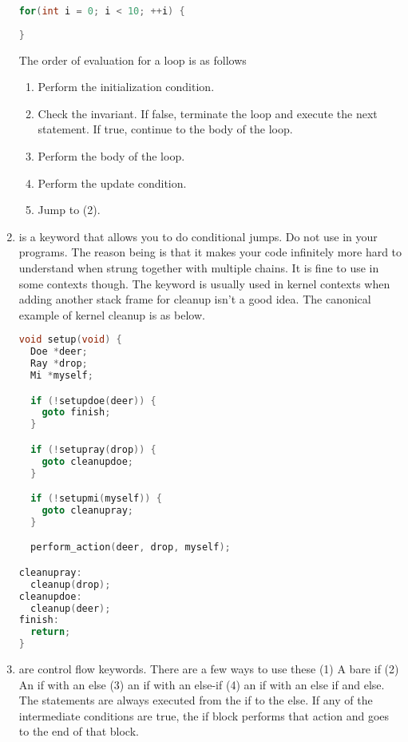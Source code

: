 \begin{enumerate}
	      \begin{lstlisting}[language=C]
for(int i = 0; i < 10; ++i) {
  
}
\end{lstlisting}

	      The order of evaluation for a  loop is as follows

	      \begin{enumerate}
		      \item Perform the initialization condition.
		      \item Check the invariant. If false, terminate the loop and execute the next statement. If true, continue to the body of the loop.
		      \item Perform the body of the loop.
		      \item Perform the update condition.
		      \item Jump to (2).
	      \end{enumerate}

	\item {} is a keyword that allows you to do conditional jumps. Do not use  in your programs. The reason being is that it makes your code infinitely more hard to understand when strung together with multiple chains. It is fine to use in some contexts though. The keyword is usually used in kernel contexts when adding another stack frame for cleanup isn't a good idea. The canonical example of kernel cleanup is as below.

	      \begin{lstlisting}[language=C]
void setup(void) {
  Doe *deer;
  Ray *drop;
  Mi *myself;

  if (!setupdoe(deer)) {
    goto finish;
  } 

  if (!setupray(drop)) {
    goto cleanupdoe;
  } 

  if (!setupmi(myself)) {
    goto cleanupray;
  }

  perform_action(deer, drop, myself);

cleanupray:
  cleanup(drop);
cleanupdoe:
  cleanup(deer);
finish:
  return;
} 
\end{lstlisting}
	\item {} are control flow keywords. There are a few ways to use these (1) A bare if (2) An if with an else (3) an if with an else-if (4) an if with an else if and else. The statements are always executed from the if to the else. If any of the intermediate conditions are true, the if block performs that action and goes to the end of that block.


\end{enumerate}

